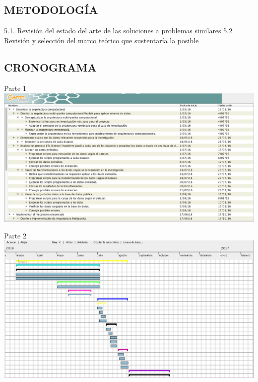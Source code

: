 \documentclass[a4paper, 11pt, oneside]{article}
\theoremstyle{definition}
\theoremstyle{remark}
\begin{document}
\begin{center}
\section{METODOLOGÍA}
\end{center}
 5.1.    Revisión del estado del arte de las soluciones a problemas similares
 5.2        Revisión y selección del marco teórico que sustentaría la posible 
    
\clearpage

\begin{table}
\begin{center}
\section{CRONOGRAMA}
\end{center}
\begin{center}
Parte 1
\includegraphics[width=\textwidth]{Imagen1.png}
\end{center}
\end{table}
\clearpage

\begin{table}
\begin{center}
Parte 2
\includegraphics[width=\textwidth]{Imagen3.png}
\end{center}
\end{table}
\clearpage
\end{document}
